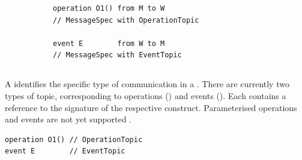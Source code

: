 \begin{figure}[h]

\begin{subfigure}[t]{0.38\textwidth}
\begin{lstlisting}[style=Example]
operation O1() from M to W
// MessageSpec with OperationTopic

event E        from W to M
// MessageSpec with EventTopic
\end{lstlisting}
\end{subfigure}
\hfill
\begin{subfigure}[t]{0.58\textwidth}
\gsecaption
\centering
{}
\end{subfigure}

\end{figure}

\subsection{\mmessagetopic}\label{ssec:metamodel-messages-topics}

A \mmessagetopic{} identifies the specific type of communication in a
\mmessagespec{}.  There are currently two types of topic, corresponding to
\robochart{} operations (\moperationtopic) and events (\meventtopic).
Each contains a reference to the signature of the respective construct.
Parameterised operations and events are not yet supported .

\begin{lstlisting}[style=Example]
operation O1() // OperationTopic
event E        // EventTopic
\end{lstlisting}

\subsection{\margument}\label{ssec:metamodel-messages-arguments}

